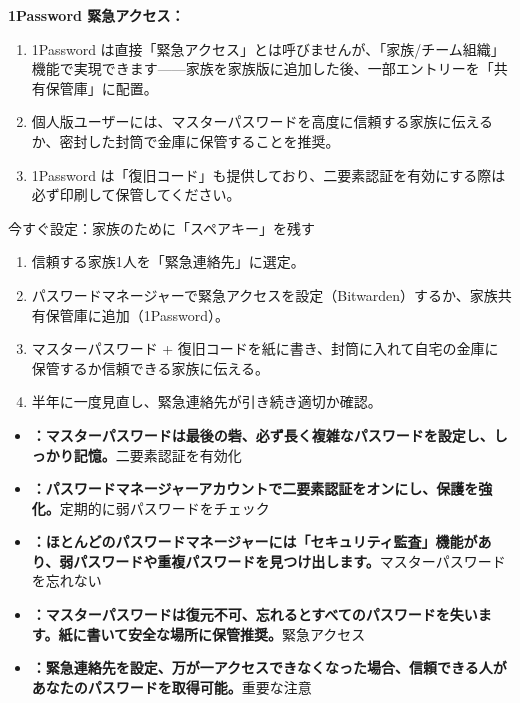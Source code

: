 \textbf{1Password 緊急アクセス：}

\begin{enumerate}
  \item 1Password は直接「緊急アクセス」とは呼びませんが、「家族/チーム組織」機能で実現できます——家族を家族版に追加した後、一部エントリーを「共有保管庫」に配置。
  \item 個人版ユーザーには、マスターパスワードを高度に信頼する家族に伝えるか、密封した封筒で金庫に保管することを推奨。
  \item 1Password は「復旧コード」も提供しており、二要素認証を有効にする際は必ず印刷して保管してください。
\end{enumerate}

\begin{tcbpractice}{今すぐ設定：家族のために「スペアキー」を残す}
\begin{enumerate}
  \item 信頼する家族1人を「緊急連絡先」に選定。
  \item パスワードマネージャーで緊急アクセスを設定（Bitwarden）するか、家族共有保管庫に追加（1Password）。
  \item マスターパスワード + 復旧コードを紙に書き、封筒に入れて自宅の金庫に保管するか信頼できる家族に伝える。
  \item 半年に一度見直し、緊急連絡先が引き続き適切か確認。
\end{enumerate}

\end{tcbpractice}


\begin{itemize}
  \item \textbf{：マスターパスワードは最後の砦、必ず長く複雑なパスワードを設定し、しっかり記憶。}二要素認証を有効化
  \item \textbf{：パスワードマネージャーアカウントで二要素認証をオンにし、保護を強化。}定期的に弱パスワードをチェック
  \item \textbf{：ほとんどのパスワードマネージャーには「セキュリティ監査」機能があり、弱パスワードや重複パスワードを見つけ出します。}マスターパスワードを忘れない
  \item \textbf{：マスターパスワードは復元不可、忘れるとすべてのパスワードを失います。紙に書いて安全な場所に保管推奨。}緊急アクセス
  \item \textbf{：緊急連絡先を設定、万が一アクセスできなくなった場合、信頼できる人があなたのパスワードを取得可能。}重要な注意
\end{itemize}


